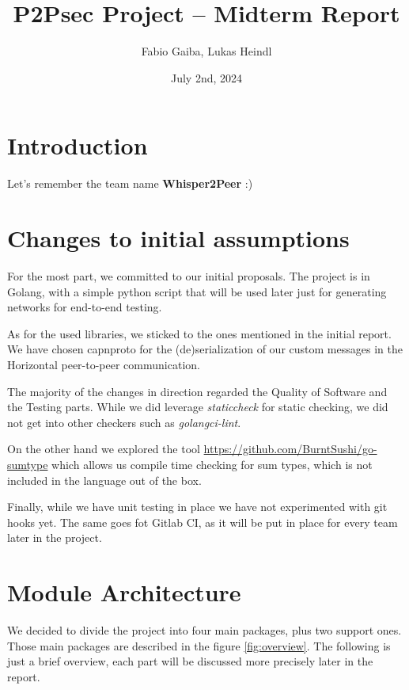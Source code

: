 \documentclass[a4paper,english,10pt,NET]{tumarticle}
\title{P2Psec Project -- Midterm Report}
\author{Fabio Gaiba, Lukas Heindl}
\date{July 2nd, 2024}
\begin{document}
\maketitle
\thispagestyle{tumarticle}

\section{Introduction}

Let's remember the team name \textbf{Whisper2Peer} :)


\section{Changes to initial assumptions}

For the most part, we committed to our initial proposals. The project is in Golang, with a simple python script that will be used later just for generating networks for end-to-end testing.


As for the used libraries, we sticked to the ones mentioned in the initial report. We have chosen capnproto for the (de)serialization of our custom messages in the Horizontal peer-to-peer communication. 

The majority of the changes in direction regarded the Quality of Software and the Testing parts. While we did leverage \textit{staticcheck} for static checking, we did not get into other checkers such as \textit{golangci-lint}. 

On the other hand we explored the tool \href{https://github.com/BurntSushi/go-sumtype}{https://github.com/BurntSushi/go-sumtype} which allows us compile time checking for sum types, which is not included in the language out of the box. 

Finally, while we have unit testing in place we have not experimented with git hooks yet. The same goes fot Gitlab CI, as it will be put in place for every team later in the project.

\section{Module Architecture}

We decided to divide the project into four main packages, plus two support ones. Those main packages are described in the figure \ref{fig:overview}. The following is just a brief overview, each part will be discussed more precisely later in the report.
\end{document}
